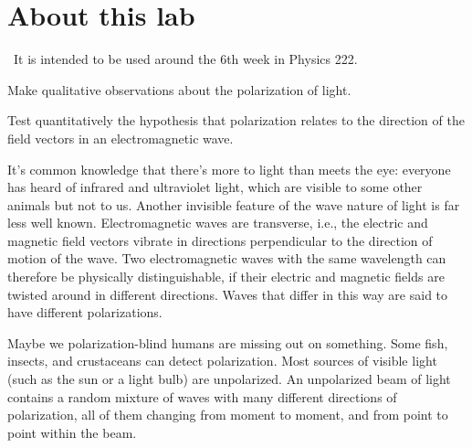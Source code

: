 \renewcommand\thechapter{c2.6}
\label{lab:polarization}

\section*{About this lab}

\covid\ 
It is intended to be used around the 6th week in Physics 222.

\apparatus
{}


\begin{goals}

\item[] Make qualitative observations about the polarization of light.

\item[] Test quantitatively the hypothesis that polarization
relates to the direction of the field vectors in an
electromagnetic wave.
\end{goals}

\introduction

 It's common knowledge that there's more to light than meets
the eye: everyone has heard of infrared and ultraviolet
light, which are visible to some other animals but not to
us. Another invisible feature of the wave nature of light is
far less well known. Electromagnetic waves are transverse,
i.e., the electric and magnetic field vectors vibrate in
directions perpendicular to the direction of motion of the
wave. Two electromagnetic waves with the same wavelength can
therefore be physically distinguishable, if their electric
and magnetic fields are twisted around in different
directions. Waves that differ in this way are said to have
different polarizations.


Maybe we polarization-blind humans are missing out on
something. Some fish, insects, and crustaceans can detect
polarization. Most sources of
visible light (such as the sun or a light bulb) are
unpolarized. An unpolarized beam of light contains a random
mixture of waves with many different directions of
polarization, all of them changing from moment to moment,
and from point to point within the beam.

